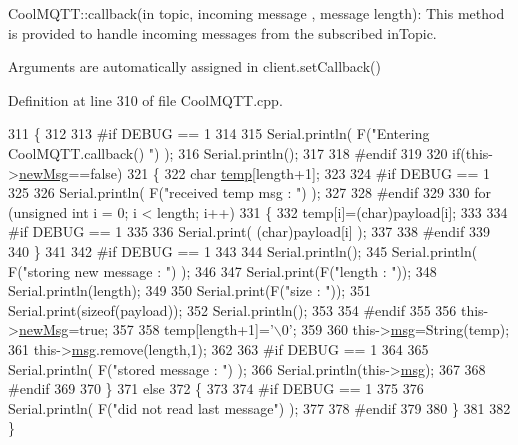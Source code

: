 Cool\+M\+Q\+T\+T\+::callback(in topic, incoming message , message length)\+: This method is provided to handle incoming messages from the subscribed in\+Topic.

Arguments are automatically assigned in client.\+set\+Callback() 

Definition at line 310 of file Cool\+M\+Q\+T\+T.\+cpp.


\begin{DoxyCode}
311 \{
312 
313 \textcolor{preprocessor}{#if DEBUG == 1}
314 
315     Serial.println( F(\textcolor{stringliteral}{"Entering CoolMQTT.callback() "}) );
316     Serial.println();
317 
318 \textcolor{preprocessor}{#endif }
319 
320     \textcolor{keywordflow}{if}(this->\hyperlink{class_cool_m_q_t_t_a3240388137b885775aadf38e96b24c6b}{newMsg}==\textcolor{keyword}{false})
321     \{
322         \textcolor{keywordtype}{char} \hyperlink{_irene3000_8h_a5905d48604152cf57aa6bfa087b49173}{temp}[length+1];
323 
324 \textcolor{preprocessor}{    #if DEBUG == 1}
325 
326         Serial.println( F(\textcolor{stringliteral}{"received temp msg : "}) );
327         
328 \textcolor{preprocessor}{    #endif}
329         
330         \textcolor{keywordflow}{for} (\textcolor{keywordtype}{unsigned} \textcolor{keywordtype}{int} i = 0; i < length; i++) 
331         \{
332             temp[i]=(char)payload[i];
333         
334 \textcolor{preprocessor}{        #if DEBUG == 1 }
335 
336             Serial.print( (\textcolor{keywordtype}{char})payload[i] );
337         
338 \textcolor{preprocessor}{        #endif}
339 
340         \}
341     
342 \textcolor{preprocessor}{    #if DEBUG == 1 }
343 
344         Serial.println();
345         Serial.println( F(\textcolor{stringliteral}{"storing new message : "}) );
346 
347         Serial.print(F(\textcolor{stringliteral}{"length : "}));
348         Serial.println(length);
349         
350         Serial.print(F(\textcolor{stringliteral}{"size : "}));
351         Serial.print(\textcolor{keyword}{sizeof}(payload));
352         Serial.println();
353     
354 \textcolor{preprocessor}{    #endif}
355 
356         this->\hyperlink{class_cool_m_q_t_t_a3240388137b885775aadf38e96b24c6b}{newMsg}=\textcolor{keyword}{true};
357 
358         temp[length+1]=\textcolor{charliteral}{'\(\backslash\)0'};
359 
360         this->\hyperlink{class_cool_m_q_t_t_af6b19e7074dbbb4ae493c44dcb53f7ff}{msg}=String(temp);
361         this->\hyperlink{class_cool_m_q_t_t_af6b19e7074dbbb4ae493c44dcb53f7ff}{msg}.remove(length,1);
362     
363 \textcolor{preprocessor}{    #if DEBUG == 1 }
364 
365         Serial.println( F(\textcolor{stringliteral}{"stored message : "}) );
366         Serial.println(this->\hyperlink{class_cool_m_q_t_t_af6b19e7074dbbb4ae493c44dcb53f7ff}{msg});
367     
368 \textcolor{preprocessor}{    #endif}
369 
370     \}
371     \textcolor{keywordflow}{else}
372     \{
373     
374 \textcolor{preprocessor}{    #if DEBUG == 1}
375 
376         Serial.println( F(\textcolor{stringliteral}{"did not read last message"}) );
377     
378 \textcolor{preprocessor}{    #endif }
379         
380     \}
381 
382 \}
\end{DoxyCode}
